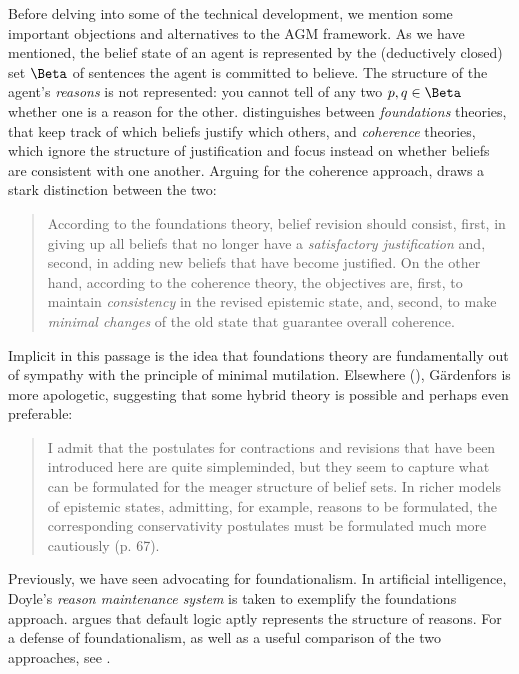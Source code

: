 Before delving into some of the technical development, we mention some important
objections and alternatives to the AGM framework. As we have mentioned, the
belief state of an agent is represented by the (deductively closed) set $\Beta$
of sentences the agent is committed to believe. The structure of the agent's {\em
reasons} is not represented: you cannot tell of any two $p,q\in \Beta$ whether
one is a reason for the other. \citet{gardenfors1992beliefrevision}
distinguishes between {\em foundations} theories, that keep track of which
beliefs justify which others, and {\em coherence} theories, which ignore the
structure of justification and focus instead on whether beliefs are consistent
with one another. Arguing for the coherence approach,
\citet{gardenfors1992beliefrevision} draws a stark distinction between the two:
\begin{quote}
According to the foundations theory, belief revision should consist, first, in
giving up all beliefs that no longer have a {\em satisfactory justification}
and, second, in adding new beliefs that have become justified. On the other
hand, according to the coherence theory, the objectives are, first, to maintain
{\em consistency} in the revised epistemic state, and, second, to make {\em
minimal changes} of the old state that guarantee overall coherence. 
\end{quote}
Implicit in this passage is the idea that foundations theory are fundamentally
out of sympathy with the principle of minimal mutilation. Elsewhere
(), G\"{a}rdenfors is more apologetic,
suggesting that some hybrid theory is possible and perhaps even preferable:
\begin{quote}
  I admit that the postulates for contractions and revisions that have been
  introduced here are quite simpleminded, but they seem to capture what can be
  formulated for the meager structure of belief sets. In richer models of
  epistemic states, admitting, for example, reasons to be formulated, the
  corresponding conservativity postulates must be formulated much more
  cautiously (p. 67).
\end{quote}
Previously, we have seen \citet{pollock1987defeasible} advocating for
foundationalism. In artificial intelligence, Doyle's 
{\em reason maintenance system} is taken to exemplify the foundations approach.
\citet{horty2012reasons} argues that default logic aptly represents the
structure of reasons. For a defense of foundationalism, as well as a useful
comparison of the two approaches, see \citet{doyle1992reason}.

